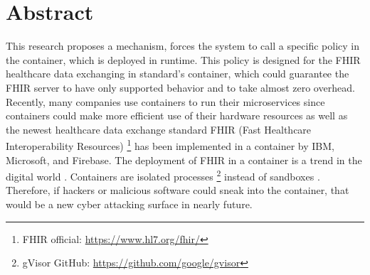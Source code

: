 \chapter*{Abstract}

This research proposes
a mechanism, forces the system to call a specific policy in the container, which is deployed in
runtime. This policy is designed for the FHIR healthcare data exchanging in standard's container, which
could guarantee the FHIR server to have only supported behavior and to take almost zero overhead.
Recently, many companies use containers to run their microservices since containers could
make more efficient use of their hardware resources as well as the newest healthcare data exchange
standard FHIR (Fast Healthcare Interoperability Resources)
\footnote{{FHIR official:  \href{https://www.hl7.org/fhir/}{https://www.hl7.org/fhir/}}} has been implemented
in a container by IBM, Microsoft, and Firebase. The deployment of FHIR in a container is a trend
in the digital world \cite{8473370}.
Containers are isolated processes \footnote{gVisor GitHub: \url{https://github.com/google/gvisor}}
instead of sandboxes \cite{10.5555/1267569.1267570}. Therefore, if hackers or malicious software could sneak
into the container, that would be a new cyber attacking surface in nearly future.
